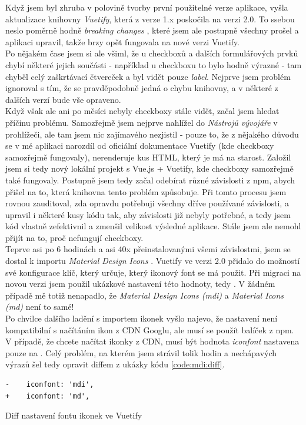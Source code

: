 Když jsem byl zhruba v polovině tvorby první použitelné verze aplikace, vyšla aktualizace knihovny \emph{Vuetify}, která z verze 1.x poskočila na verzi 2.0. To ssebou neslo poměrně hodně \emph{breaking changes} \cite{vuetify-2-upgrade}, které jsem ale postupně všechny prošel a aplikaci upravil, takže brzy opět fungovala na nové verzi Vuetify.\\
Po nějakém čase jsem si ale všiml, že u checkboxů a dalších formulářových prvků chybí některé jejich součásti - například u checkboxu to bylo hodně výrazné - tam chyběl celý zaškrtávací čtvereček a byl vidět pouze \emph{label}. Nejprve jsem problém ignoroval s tím, že se pravděpodobně jedná o chybu knihovny, a v některé z dalších verzí bude vše opraveno.\\
Když však ale ani po měsíci nebyly checkboxy stále vidět, začal jsem hledat příčinu problému. Samozřejmě jsem nejprve nahlížel do \emph{Nástrojů vývojáře} v prohlížeči, ale tam jsem nic zajímavého nezjistil - pouze to, že z nějakého důvodu se v mé aplikaci narozdíl od oficiální dokumentace Vuetify \cite{vuetify-doc-checkbox} (kde checkboxy samozřejmě fungovaly), nerenderuje kus HTML, který je má na starost. Založil jsem si tedy nový lokální projekt s Vue.js + Vuetify, kde checkboxy samozřejmě také fungovaly. Postupně jsem tedy začal odebírat různé závislosti z npm, abych přišel na to, která knihovna tento problém způsobuje. Při tomto procesu jsem rovnou zauditoval, zda opravdu potřebuji všechny dříve používané závislosti, a upravil i některé kusy kódu tak, aby závislosti již nebyly potřebné, a tedy jsem kód vlastně zefektivnil a zmenšil velikost výsledné aplikace. Stále jsem ale nemohl přijít na to, proč nefungují checkboxy.\\
Teprve asi po 6 hodinách a asi 40x přeinstalovanými všemi závislostmi, jsem se dostal k importu \emph{Material Design Icons} \cite{mdi}. Vuetify ve verzi 2.0 přidalo do možností své konfigurace klíč, který určuje, který ikonový font se má použit. Při migraci na novou verzi jsem použil ukázkové nastavení této hodnoty, tedy . V žádném případě mě totiž nenapadlo, že \emph{Material Design Icons (mdi)} a \emph{Material Icons (md)} není to samé!\\
Po chvilce dalšího ladění s importem ikonek vyšlo najevo, že nastavení  není kompatibilní s načítáním ikon z CDN Googlu, ale musí se použít balíček z npm. V případě, že chcete načítat ikonky z CDN, musí být hodnota \emph{iconfont} nastavena pouze na . Celý problém, na kterém jsem strávil tolik hodin a nechápavých výrazů šel tedy opravit diffem z ukázky kódu \ref{code:mdi:diff}.

\begin{listing}[h]
\begin{verbatim}
-    iconfont: 'mdi',
+    iconfont: 'md',
\end{verbatim}
\caption{Diff nastavení fontu ikonek ve Vuetify} \label{code:mdi:diff}
\end{listing}
